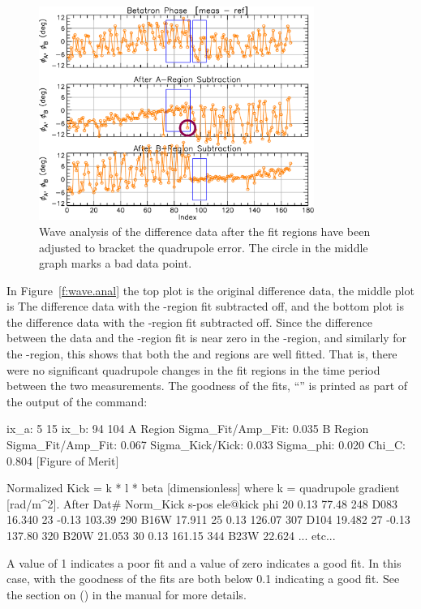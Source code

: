 \documentclass{hitec}     %
\begin{document}
\begin{figure}[tb]
  \centering
  \includegraphics[width=0.8\textwidth]{wave-anal2.pdf}
  \caption{
Wave analysis of the  difference data after the fit regions have been adjusted to bracket
the quadrupole error. The circle in the middle graph marks a bad data point.
  }
  \label{f:wave.anal2}
\end{figure}

In Figure~\ref{f:wave.anal} the top plot is the original  difference data, the middle
plot is The difference data with the -region fit subtracted off, and the bottom plot is the
difference data with the -region fit subtracted off. Since the difference between the data and
the -region fit is near zero in the -region, and similarly for the -region, this
shows that both the  and  regions are well fitted. That is, there were no significant
quadrupole changes in the fit regions in the time period between the two measurements. The goodness
of the fits, ``'' is printed as part of the output of the  command:
\begin{code}
ix_a:   5  15
ix_b:  94 104
A Region Sigma_Fit/Amp_Fit:     0.035
B Region Sigma_Fit/Amp_Fit:     0.067
Sigma_Kick/Kick:    0.033
Sigma_phi:          0.020
Chi_C:              0.804 [Figure of Merit]

Normalized Kick = k * l * beta [dimensionless]
   where k = quadrupole gradient [rad/m^2].
After Dat#    Norm_Kick     s-pos   ele@kick                       phi
       20          0.13     77.48   248   D083                    16.340
       23         -0.13    103.39   290   B16W                    17.911
       25          0.13    126.07   307   D104                    19.482
       27         -0.13    137.80   320   B20W                    21.053
       30          0.13    161.15   344   B23W                    22.624
... etc...
\end{code}
A value of 1 indicates a poor fit and a value of zero indicates a good fit. In this case, with the
goodness of the fits are both below 0.1 indicating a good fit. See the section on  () in the \tao manual for more details.
\end{document}
